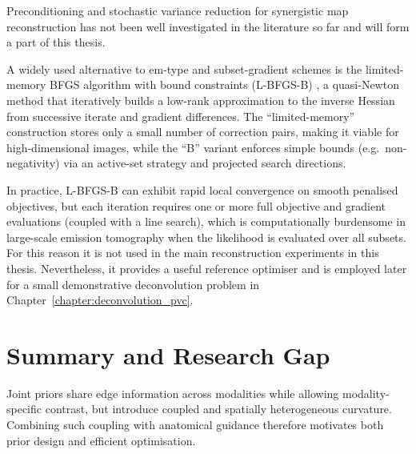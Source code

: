 Preconditioning and stochastic variance reduction for synergistic \gls{map} reconstruction has not been well investigated in the literature so far and will form a part of this thesis.

A widely used alternative to \gls{em}-type and subset-gradient schemes is the limited-memory BFGS algorithm with bound constraints (L-BFGS-B) \cite{broydenConvergenceClassDoublerank1970, fletcherNewApproachVariable1970, goldfarbFamilyVariablemetricMethods1970, shannoConditioningQuasiNewtonMethods1970, liuLimitedMemoryBFGS1989, byrd_limited_1995, zhuAlgorithm778LBFGSB1997}, a quasi-Newton method that iteratively builds a low-rank approximation to the inverse Hessian from successive iterate and gradient differences. The “limited-memory” construction stores only a small number of correction pairs, making it viable for high-dimensional images, while the “B” variant enforces simple bounds (e.g.\ non-negativity) via an active-set strategy and projected search directions. 

In practice, L-BFGS-B can exhibit rapid local convergence on smooth penalised objectives, but each iteration requires one or more full objective and gradient evaluations (coupled with a line search), which is computationally burdensome in large-scale emission tomography when the likelihood is evaluated over all subsets. For this reason it is not used in the main reconstruction experiments in this thesis. Nevertheless, it provides a useful reference optimiser and is employed later for a small demonstrative deconvolution problem in Chapter~\ref{chapter:deconvolution_pvc}.

\section{Summary and Research Gap}

Joint priors share edge information across modalities while allowing modality-specific contrast, but introduce coupled and spatially heterogeneous curvature. Combining such coupling with anatomical guidance therefore motivates both prior design and efficient optimisation.

